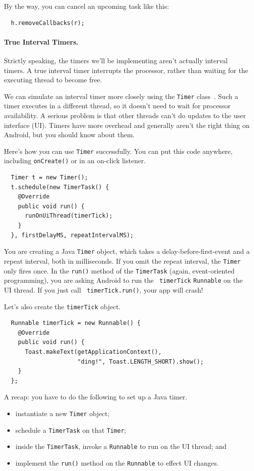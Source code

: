 By the way, you can cancel an upcoming task like this:
{\small \begin{lstlisting}
  h.removeCallbacks(r);
\end{lstlisting}}

\paragraph{True Interval Timers.}
Strictly speaking, the timers we'll be implementing aren't actually
interval timers. A true interval timer interrupts the processor,
rather than waiting for the executing thread to become free.

We can simulate an interval timer more closely using the {\tt Timer}
class~\cite{ody}. Such a timer executes in a different thread,
so it doesn't need to wait for processor availability. A serious
problem is that other threads can't do updates to the user interface
(UI). Timers have more overhead and generally aren't the right thing
on Android, but you should know about them.

Here's how you can use {\tt Timer} successfully. You can put this code
anywhere, including {\tt onCreate()} or in an on-click listener.

{\small \begin{lstlisting}
  Timer t = new Timer();
  t.schedule(new TimerTask() {
    @Override
    public void run() {
      runOnUiThread(timerTick);
    }
  }, firstDelayMS, repeatIntervalMS);
\end{lstlisting}}

You are creating a Java {\tt Timer} object, which takes a
delay-before-first-event and a repeat interval, both in
milliseconds. If you omit the repeat interval, the {\tt Timer} only
fires once. In the {\tt run()} method of the {\tt TimerTask} (again,
event-oriented programming), you are asking Android to run the {\tt
  timerTick} {\tt Runnable} on the UI thread. If you just call {\tt
  timerTick.run()}, your app will crash!

Let's also create the {\tt timerTick} object.
{\small \begin{lstlisting}
  Runnable timerTick = new Runnable() {
    @Override
    public void run() {
      Toast.makeText(getApplicationContext(), 
                     "ding!", Toast.LENGTH_SHORT).show();
    }
  };
\end{lstlisting}}

A recap: you have to do the following to set up a Java timer.
\begin{itemize}
\item instantiate a new {\tt Timer} object;
\item schedule a {\tt TimerTask} on that {\tt Timer};
\item inside the {\tt TimerTask}, invoke a {\tt Runnable} to run on the
UI thread; and
\item implement the {\tt run()} method on the {\tt Runnable} to effect
  UI changes.  
\end{itemize}

